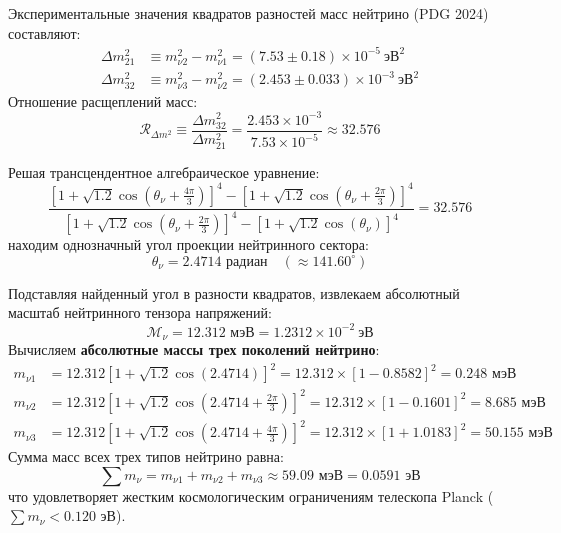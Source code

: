 \documentclass[12pt,a4paper]{article}
\begin{document}
Экспериментальные значения квадратов разностей масс нейтрино (PDG 2024) составляют:
\begin{align}
	\Delta m_{21}^2 &\equiv m_{\nu 2}^2 - m_{\nu 1}^2 = (7.53 \pm 0.18) \times 10^{-5} \ \text{эВ}^2 \\
	\Delta m_{32}^2 &\equiv m_{\nu 3}^2 - m_{\nu 2}^2 = (2.453 \pm 0.033) \times 10^{-3} \ \text{эВ}^2
\end{align}
Отношение расщеплений масс:
\begin{equation}
	\mathcal{R}_{\Delta m^2} \equiv \frac{\Delta m_{32}^2}{\Delta m_{21}^2} = \frac{2.453 \times 10^{-3}}{7.53 \times 10^{-5}} \approx \mathbf{32.576}
\end{equation}

Решая трансцендентное алгебраическое уравнение:
\begin{equation}
	\frac{\left[ 1 + \sqrt{1.2} \cos\left(\theta_\nu + \frac{4\pi}{3}\right) \right]^4 - \left[ 1 + \sqrt{1.2} \cos\left(\theta_\nu + \frac{2\pi}{3}\right) \right]^4}{\left[ 1 + \sqrt{1.2} \cos\left(\theta_\nu + \frac{2\pi}{3}\right) \right]^4 - \left[ 1 + \sqrt{1.2} \cos(\theta_\nu) \right]^4} = 32.576
\end{equation}
находим однозначный угол проекции нейтринного сектора:
\begin{equation}
	\theta_\nu = \mathbf{2.4714 \text{ радиан}} \quad (\approx 141.60^{\circ})
\end{equation}

Подставляя найденный угол в разности квадратов, извлекаем абсолютный масштаб нейтринного тензора напряжений:
\begin{equation}
	\mathcal{M}_\nu = \mathbf{12.312 \text{ мэВ}} = 1.2312 \times 10^{-2} \ \text{эВ}
\end{equation}
Вычисляем \textbf{абсолютные массы трех поколений нейтрино}:
\begin{align}
	m_{\nu 1} &= 12.312 \left[ 1 + \sqrt{1.2} \cos(2.4714) \right]^2 = 12.312 \times [1 - 0.8582]^2 = \mathbf{0.248 \text{ мэВ}} \\
	m_{\nu 2} &= 12.312 \left[ 1 + \sqrt{1.2} \cos\left(2.4714 + \frac{2\pi}{3}\right) \right]^2 = 12.312 \times [1 - 0.1601]^2 = \mathbf{8.685 \text{ мэВ}} \\
	m_{\nu 3} &= 12.312 \left[ 1 + \sqrt{1.2} \cos\left(2.4714 + \frac{4\pi}{3}\right) \right]^2 = 12.312 \times [1 + 1.0183]^2 = \mathbf{50.155 \text{ мэВ}}
\end{align}
Сумма масс всех трех типов нейтрино равна:
\begin{equation}
	\sum m_\nu = m_{\nu 1} + m_{\nu 2} + m_{\nu 3} \approx \mathbf{59.09 \text{ мэВ}} = \mathbf{0.0591 \text{ эВ}}
\end{equation}
что удовлетворяет жестким космологическим ограничениям телескопа Planck ($\sum m_\nu < 0.120$ эВ).
\end{document}
